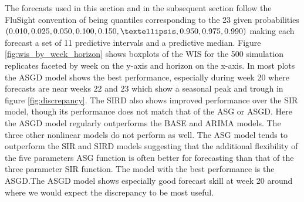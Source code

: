 




The forecasts used in this section and in the subsequent section follow the 
FluSight convention of being quantiles corresponding to the 23 given 
probabilities $\\(0.010, 0.025, 0.050, 0.100, 0.150, …, 0.950, 0.975, 0.990)$
making each forecast a set of 11 predictive intervals and a predictive median.
Figure \ref{fig:wis_by_week_horizon} shows 
boxplots of the WIS for the 500 simulation replicates faceted by week 
on the y-axis and horizon on the x-axis. 
In most plots the ASGD model shows the best performance, 
especially during week 20 where
forecasts are near weeks 22 and 23 which show a seasonal peak and trough in 
figure \ref{fig:discrepancy}. The SIRD also shows improved performance over the
SIR model, though its performance does not match that of the ASG or ASGD.
Here the ASGD model regularly outperforms
the BASE and ARIMA models. The three other nonlinear models do not perform as
well.
The ASG model
tends to outperform the SIR and SIRD models suggesting that the additional 
flexibility of the five parameters ASG function 
is often better for forecasting than that of the three parameter SIR function.
The model with the best performance is the ASGD.The ASGD model shows 
especially good forecast skill at week 20 around where we would expect the 
discrepancy to be most useful. 



